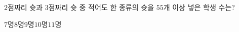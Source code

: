$2$점짜리 슛과 $3$점짜리 슛 중 적어도 한 종류의 슛을 $55$개 이상 넣은 학생 수는?
\begin{choices32}{$7$명}{$8$명}{$9$명}{$10$명}{$11$명}\end{choices32}
